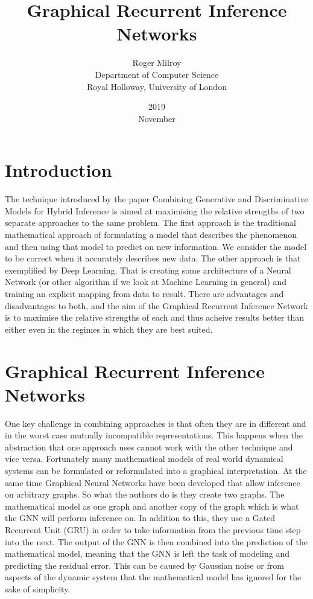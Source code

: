 \documentclass[]{article}
\begin{document}
\title{Graphical Recurrent Inference Networks}
\date{2019\\ November}
\author{Roger Milroy\\ Department of Computer Science\\ Royal Holloway, University of London}

\maketitle

\section{Introduction}

The technique introduced by the paper Combining Generative and Discriminative Models for Hybrid Inference \cite{Satorras2019CombiningGA} is aimed at maximising the relative strengths of two separate approaches to the same problem.
The first approach is the traditional mathematical approach of formulating a model that describes the phenomenon and then using that model to predict on new information. We consider the model to be correct when it accurately describes new data.
The other approach is that exemplified by Deep Learning. That is creating some architecture of a Neural Network (or other algorithm if we look at Machine Learning in general) and training an explicit mapping from data to result.
There are advantages and disadvantages to both, and the aim of the Graphical Recurrent Inference Network is to maximise the relative strengths of each and thus acheive results better than either even in the regimes in which they are best suited.


\section{Graphical Recurrent Inference Networks}

One key challenge in combining approaches is that often they are in different and in the worst case mutually incompatible representations. This happens when the abstraction that one approach uses cannot work with the other technique and vice versa.
Fortunately many mathematical models of real world dynamical systems can be formulated or reformulated into a graphical interpretation. At the same time Graphical Neural Networks have been developed that allow inference on arbitrary graphs.
So what the authors do is they create two graphs. The mathematical model as one graph and another copy of the graph which is what the GNN will perform inference on. In addition to this, they use a Gated Recurrent Unit (GRU) in order to take information from the previous time step into the next.
The output of the GNN is then combined into the prediction of the mathematical model, meaning that the GNN is left the task of modeling and predicting the residual error. This can be caused by Gaussian noise or from aspects of the dynamic system that the mathematical model has ignored for the sake of simplicity.
\end{document}
